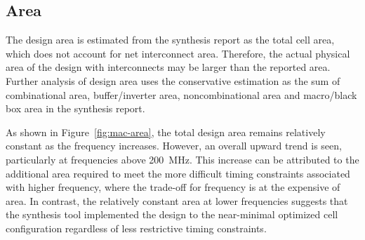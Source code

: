 \documentclass[a4paper,11pt]{article}
\begin{document}



\subsection{Area}

The design area is estimated from the synthesis report as the total cell area, which does not account for net interconnect area. Therefore, the actual physical area of the design with interconnects may be larger than the reported area. Further analysis of design area uses the conservative estimation as the sum of combinational area, buffer/inverter area, noncombinational area and macro/black box area in the synthesis report.


As shown in Figure~\ref{fig:mac-area}, the total design area remains relatively constant as the frequency increases. However, an overall upward trend is seen, particularly at frequencies above 200~MHz. This increase can be attributed to the additional area required to meet the more difficult timing constraints associated with higher frequency, where the trade-off for frequency is at the expensive of area. In contrast, the relatively constant area at lower frequencies suggests that the synthesis tool implemented the design to the near-minimal optimized cell configuration regardless of less restrictive timing constraints. 
\end{document}
